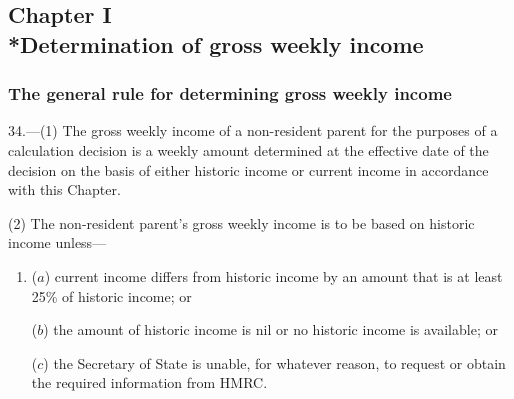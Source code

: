 \documentclass[12pt,a4paper]{article}
\begin{document}
\subsection[Chapter I --- Determination of gross weekly income]{Chapter I\\*Determination of gross weekly income}

\renewcommand\parthead{--- Part IV Chapter I}

\subsubsection[34. The general rule for determining gross weekly income]{The general rule for determining gross weekly income}

34.---(1)  The gross weekly income of a non-resident parent for the purposes of a calculation decision is a weekly amount determined at the effective date of the decision on the basis of either historic income or current income in accordance with this Chapter.

(2) The non-resident parent’s gross weekly income is to be based on historic income unless—
\begin{enumerate}\item[]
($a$) current income differs from historic income by an amount that is at least 25\% of historic income; or

($b$) 
the amount of historic income is nil or  %
no historic income is available;
%
or

($c$) the Secretary of State is unable, for whatever reason, to request or obtain the required information from HMRC.
\end{enumerate}

%
\end{document}
